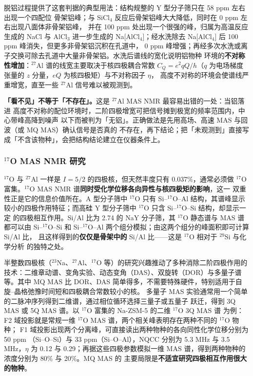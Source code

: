 脱铝过程提供了这套判据的典型用法：结构规整的 Y 型分子筛只在 58 ppm 左右出现一个四配位
骨架铝峰；与 SiCl$_{4}$ 反应后骨架铝峰大大降低，同时在 0 ppm 左右出现八面体非骨架铝峰，
并在 100 ppm 处出现一个很强的峰，归属为高温反应生成的 NaCl 与 AlCl$_{3}$ 进一步生成的
Na[AlCl$_{4}$]；经水洗除去 Na[AlCl$_{4}$] 后 100 ppm 峰消失，但更多非骨架铝沉积在孔道中，
0 ppm 峰增强；再经多次水洗或离子交换可除去孔道中大量非骨架铝。水洗后谱线的宽化说明铝物种
环境的\textbf{不对称性增加}：$^{27}$Al 谱的线宽主要取决于核四极耦合常数
$C_{Q}=e^{2}qQ/h$（$q$ 为电场梯度张量的 $z$ 分量，$eQ$ 为核四极矩）与不对称因子 $\eta$，
高度不对称的环境会使谱线严重增宽，直至一些 $^{27}$Al 信号难以被观测到。

\begin{pitfall}
\textbf{「看不见」不等于「不存在」。}这是 $^{27}$Al MAS NMR 最容易出错的一处：当铝落进
高度不对称的配位环境时，二阶四极增宽可把信号摊到极宽的频率范围内，中心带峰高降到噪声
以下而被判为「无铝」。正确做法是先用高场、高速 MAS 与回波（或 MQ MAS）确认信号是否真的
不存在，再下结论；把「未观测到」直接写成「不含该物种」，会把结构结论建立在仪器条件上。
\end{pitfall}

\subsubsection{$^{17}$O MAS NMR 研究}

$^{17}$O 与 $^{27}$Al 一样是 $I=5/2$ 的四极核，但天然丰度只有 0.037\%，通常必须做
$^{17}$O 富集。$^{17}$O MAS NMR 谱\textbf{同时受化学位移各向异性与核四极矩的影响}，这一
双重性正是它的信息价值所在。A 型分子筛中 $^{17}$O 只有 Si--$^{17}$O--Al 结构，其谱峰显示
较小的四极作用特征；而高硅 Y 型分子筛中 $^{17}$O 只含 Si--$^{17}$O--Si 结构，却显示一定
的四极相互作用。Si/Al 比为 2.74 的 NaY 分子筛，其 $^{17}$O 静态谱与 MAS 谱都可以由
Si--$^{17}$O--Si 和 Si--$^{17}$O--Al 两个组分模拟；由这两个组分的峰面积即可计算 Si/Al 比，
且这样得到的\textbf{仅仅是骨架中的} Si/Al 比——这是 $^{17}$O 相对于 $^{29}$Si 与化学分析
的独特之处。

半整数四极核（$^{23}$Na、$^{27}$Al、$^{17}$O 等）的研究兴趣推动了多种消除二阶四极作用的
技术：二维章动谱、变角实验、动态变角（DAS）、双旋转（DOR）与多量子谱等。其中 MQ MAS 比
DOR、DAS 简单得多，不需要特殊硬件，特别适用于自旋--晶格弛豫时间短和四极耦合常数较小的核。
多量子 MAS 实验通常用一个简单的二脉冲序列得到二维谱，通过相位循环选择三量子或五量子
跃迁，得到 3Q MAS 或 5Q MAS 谱。以 $^{17}$O 富集的 Na-ZSM-5 的二维 $^{17}$O 3Q MAS 谱
为例：F2 域投影就是常规一维 $^{17}$O MAS 谱，两个相关峰表明存在两种不同的 $^{17}$O 物种；
F1 域投影出现两个分离峰，可直接读出两种物种的各向同性化学位移分别为 50 ppm
（Si--O--Si）与 33 ppm（Si--O--Al），NQCC 分别为 5.3 MHz 与 3.5 MHz，$\eta$ 为 0.12 与
0.29；再据这些四极参数模拟一维 MAS 谱，得到两种物种的浓度分别为 80\% 与 20\%。MQ MAS 的
主要局限是\textbf{不适宜研究四极相互作用很大的物种}。

